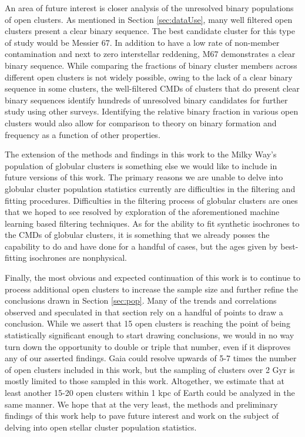 \documentclass[onecolumn,table,xcdraw,super]{aastex631}
\begin{document}
An area of future interest is closer analysis of the unresolved binary populations of open clusters. As mentioned in Section \ref{sec:dataUse}, many well filtered open clusters present a clear binary sequence. The best candidate cluster for this type of study would be Messier 67. In addition to have a low rate of non-member contamination and next to zero interstellar reddening, M67 demonstrates a clear binary sequence. While comparing the fractions of binary cluster members across different open clusters is not widely possible, owing to the lack of a clear binary sequence in some clusters, the well-filtered CMDs of clusters that do present clear binary sequences identify hundreds of unresolved binary candidates for further study using other surveys. Identifying the relative binary fraction in various open clusters would also allow for comparison to theory on binary formation and frequency as a function of other properties.

The extension of the methods and findings in this work to the Milky Way's population of globular clusters is something else we would like to include in future versions of this work. The primary reasons we are unable to delve into globular cluster population statistics currently are difficulties in the filtering and fitting procedures. Difficulties in the filtering process of globular clusters are ones that we hoped to see resolved by exploration of the aforementioned machine learning based filtering techniques. As for the ability to fit synthetic isochrones to the CMDs of globular clusters, it is something that we already posses the capability to do and have done for a handful of cases, but the ages given by best-fitting isochrones are nonphysical.

Finally, the most obvious and expected continuation of this work is to continue to process additional open clusters to increase the sample size and further refine the conclusions drawn in Section \ref{sec:pop}. Many of the trends and correlations observed and speculated in that section rely on a handful of points to draw a conclusion. While we assert that 15 open clusters is reaching the point of being statistically significant enough to start drawing conclusions, we would in no way turn down the opportunity to double or triple that number, even if it disproves any of our asserted findings. Gaia could resolve upwards of 5-7 times the number of open clusters included in this work, but the sampling of clusters over 2 Gyr is mostly limited to those sampled in this work. Altogether, we estimate that at least another 15-20 open clusters within 1 kpc of Earth could be analyzed in the same manner. We hope that at the very least, the methods and preliminary findings of this work help to pave future interest and work on the subject of delving into open stellar cluster population statistics.
\end{document}
